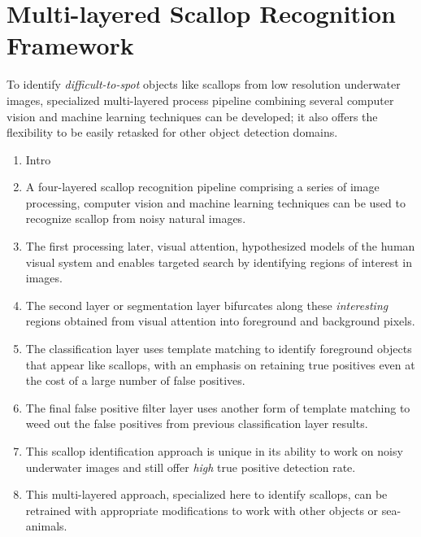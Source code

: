 \documentclass {udthesis}
\begin{document}

\chapter{Multi-layered Scallop Recognition Framework}



To identify \emph{difficult-to-spot} objects like scallops from low resolution underwater images, specialized multi-layered process pipeline combining several computer vision and machine learning techniques can be developed; it also offers the flexibility to be easily retasked for other object detection domains.

\begin{enumerate}[label=Section \arabic*:, start=0]
\item Intro

\item A four-layered scallop recognition pipeline comprising a series of image processing, computer vision and machine learning techniques can be used to recognize scallop from noisy natural images.
  
\item The first processing later, visual attention, hypothesized models of the human visual system and enables targeted search by identifying regions of interest in images.

\item The second layer or segmentation layer bifurcates along these \emph{interesting} regions obtained from visual attention into foreground and background pixels.

\item The classification layer uses template matching to identify foreground objects that appear like scallops, with an emphasis on retaining true positives even at the cost of a large number of false positives.

\item The final false positive filter layer uses another form of template matching to weed out the false positives from previous classification layer results.

\item This scallop identification approach is unique in its ability to work on noisy underwater images and still offer \emph{high} true positive detection rate.

\item This multi-layered approach, specialized here to identify scallops, can be retrained with appropriate modifications to work with other objects or sea-animals.

\end{enumerate}
\end{document}
